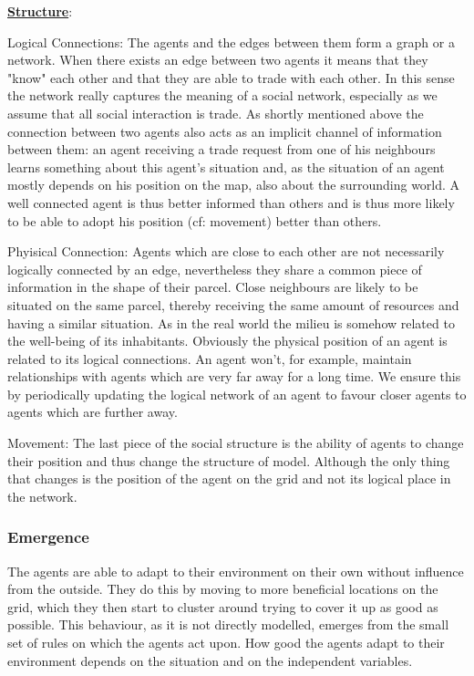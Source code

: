\documentclass{JASSS}
\begin{document}
	\textbf{\underline{Structure}}:
	\begin{description*}
		\item[Logical Connections:]
			The agents and the edges between them form a graph or a network. When there exists an edge between two agents it means that they "know" each other and that they are able to trade with each other. In this sense the network really captures the meaning of a social network, especially as we assume that all social interaction is trade. As shortly mentioned above the connection between two agents also acts as an implicit channel of information between them: an agent receiving a trade request from one of his neighbours learns something about this agent's situation and, as the situation of an agent mostly depends on his position on the map, also about the surrounding world. A well connected agent is thus better informed than others and is thus more likely to be able to adopt his position (cf: movement) better than others.
			
		\item[Phyisical Connection:]
			Agents which are close to each other are not necessarily logically connected by an edge, nevertheless they share a common piece of information in the shape of their parcel. Close neighbours are likely to be situated on the same parcel, thereby receiving the same amount of resources and having a similar situation. As in the real world the milieu is somehow related to the well-being of its inhabitants. Obviously the physical position of an agent is related to its logical connections. An agent won't, for example, maintain relationships with agents which are very far away for a long time. We ensure this by periodically updating the logical network of an agent to favour closer agents to agents which are further away.
			
		\item[Movement:]
			The last piece of the social structure is the ability of agents to change their position and thus change the structure of model. Although the only thing that changes is the position of the agent on the grid and not its logical place in the network. 
	\end{description*}
	

\subsubsection{Emergence}
	The agents are able to adapt to their environment on their own without influence from the outside. They do this by moving to more beneficial locations on the grid, which they then start to cluster around trying to cover it up as good as possible. This behaviour, as it is not directly modelled, emerges from the small set of rules on which the agents act upon. How good the agents adapt to their environment depends on the situation and on the independent variables.
\end{document}
